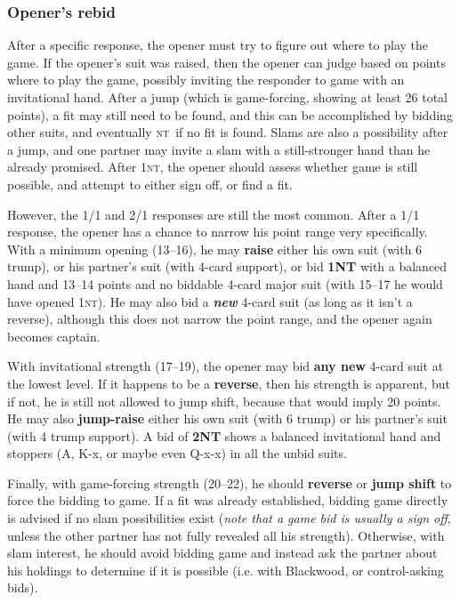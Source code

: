 \documentclass[11pt]{article}
\def\NT{\textsc{nt}}
\begin{document}
\subsubsection{Opener's rebid}

After a specific response, the opener must try to figure out where
to play the game.  If the opener's suit was raised, then the opener
can judge based on points where to play the game, possibly inviting
the responder to game with an invitational hand.  After a jump (which
is game-forcing, showing at least 26 total points), a fit may still
need to be found, and this can be accomplished by bidding other
suits, and eventually \NT\ if no fit is found.  Slams are also
a possibility after a jump, and one partner may invite a slam
with a still-stronger hand than he already promised.  After 1\NT,
the opener should assess whether game is still possible, and attempt
to either sign off, or find a fit.

However, the 1/1 and 2/1 responses are still the most common.  After a
1/1 response, the opener has a chance to narrow his point range very
specifically.  With a minimum opening (13--16), he may \textbf{raise}
either his own suit (with 6 trump), or his partner's suit (with 4-card
support), or bid \textbf{1NT} with a balanced hand and 13--14 points
and no biddable 4-card major suit (with 15--17 he would have opened
1\NT).  He may also bid a \textbf{\emph{new}} 4-card suit (as long as
it isn't a reverse), although this does not narrow the point range,
and the opener again becomes captain.

With invitational strength (17--19), the opener may bid \textbf{any
new} 4-card suit at the lowest level.  If it happens to be a \textbf{reverse},
then his strength is apparent, but if not, he is still not allowed to
jump shift, because that would imply 20 points.  He may also
\textbf{jump-raise} either his own suit (with 6 trump) or his partner's suit
(with 4 trump support).  A bid of \textbf{2NT} shows a balanced invitational
hand and stoppers (A, K-x, or maybe even Q-x-x) in all the unbid suits.

Finally, with game-forcing strength (20--22), he should
\textbf{reverse} or \textbf{jump shift} to force the bidding to game.
If a fit was already established, bidding game directly is advised if
no slam possibilities exist (\emph{note that a game bid is usually a sign
off}, unless the other partner has not fully revealed all his
strength).  Otherwise, with slam interest, he should avoid bidding
game and instead ask the partner about his holdings to determine if it
is possible (i.e. with Blackwood, or control-asking bids).
\end{document}
